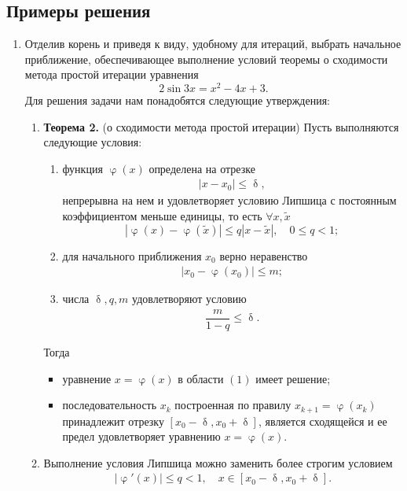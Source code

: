 \documentclass[a4paper, 12pt]{report}
\renewcommand{\leq}{\leqslant}
\renewcommand{\delta}{\updelta}
\renewcommand{\varphi}{\upvarphi}
\begin{document}
	\subsection{Примеры решения}
	\begin{enumerate}
		\item Отделив корень и приведя к виду, удобному для итераций, выбрать начальное приближение, обеспечивающее выполнение условий теоремы о сходимости метода простой итерации уравнения $$2\sin3x = x^2 - 4x + 3.$$
		Для решения задачи нам понадобятся следующие утверждения:
		\begin{enumerate}
			\item \textbf{Теорема 2.}
			(о сходимости метода простой итерации)
			Пусть выполняются следующие условия:\begin{enumerate}
				\item функция $\varphi(x)$ определена на отрезке \begin{eqnarray}
					|x - x_0| \leq \delta,
				\end{eqnarray} непрерывна на нем и удовлетворяет условию Липшица с постоянным коэффициентом меньше единицы, то есть $\forall x, \widetilde{x}$ $$|\varphi(x) - \varphi(\widetilde{x})| \leq q |x - \widetilde{x}| ,\quad 0 \leq q < 1;$$
				\item для начального приближения $x_0$ верно неравенство \begin{eqnarray}
					|x_0 - \varphi(x_0)| \leq m;
				\end{eqnarray}
				\item числа $\delta, q, m$ удовлетворяют условию 
				\begin{eqnarray}
					\dfrac{m}{1-q}\leq \delta.
				\end{eqnarray}
			\end{enumerate}
			Тогда \begin{itemize}
				\item уравнение $x = \varphi(x)$ в области $(1)$ имеет решение;
				\item последовательность $x_k$ построенная по правилу $x_{k+1} = \varphi(x_k)$ принадлежит отрезку $[x_0 - \delta, x_0 + \delta]$, является сходящейся и ее предел удовлетворяет уравнению $x = \varphi(x)$.
			\end{itemize}
			\item Выполнение условия Липшица можно заменить более строгим условием 
			\begin{eqnarray}
				|\varphi'(x)| \leq q < 1,\quad x \in [x_0-\delta, x_0 + \delta].
			\end{eqnarray}

\end{enumerate}
\end{enumerate}
\end{document}
